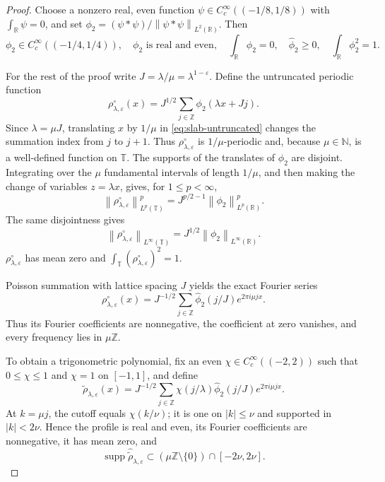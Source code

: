 \documentclass[12pt,reqno,letterpaper]{amsart}
\numberwithin{equation}{section}
\theoremstyle{definition}
\newcommand{\T}{\mathbb T}
\newcommand{\R}{\mathbb R}
\newcommand{\Z}{\mathbb Z}
\newcommand{\eps}{\varepsilon}
\newcommand{\la}{\lambda}
\newcommand{\supp}{\operatorname{supp}}
\newcommand{\norm}[1]{\left\lVert #1\right\rVert}
\newcommand{\abs}[1]{\left\lvert #1\right\rvert}
\begin{document}
\begin{proof}
Choose a nonzero real, even function $\psi\in C_c^\infty((-1/8,1/8))$
with $\int_\R\psi=0$, and set
$\phi_2=(\psi*\psi)/\norm{\psi*\psi}_{L^2(\R)}$.  Then
\begin{equation*}
 \phi_2\in C_c^\infty((-1/4,1/4)),\quad
 \phi_2\text{ is real and even},\quad
 \int_\R\phi_2=0,\quad \widehat\phi_2\geq0,
 \quad \int_\R\phi_2^2=1.
\end{equation*}

For the rest of the proof write $J=\la/\mu=\la^{1-\eps}$.  Define the
untruncated periodic function
\begin{equation}\label{eq:slab-untruncated}
 \rho^\circ_{\la,\eps}(x)
 =J^{1/2}\sum_{j\in\Z}\phi_2(\la x+Jj).
\end{equation}
Since $\la=\mu J$, translating $x$ by $1/\mu$ in
\eqref{eq:slab-untruncated} changes the summation index from $j$ to
$j+1$.  Thus
$\rho^\circ_{\la,\eps}$ is $1/\mu$-periodic and, because
$\mu\in\mathbb N$, is a
well-defined function on $\T$.  The supports of the translates of $\phi_2$ are
disjoint.  Integrating over the $\mu$ fundamental intervals of length
$1/\mu$, and then making the change of variables $z=\la x$, gives, for
$1\leq p<\infty$,
\begin{equation}\label{eq:slab-untruncated-Lp}
 \norm{\rho^\circ_{\la,\eps}}_{L^p(\T)}^p
 =J^{p/2-1}\norm{\phi_2}_{L^p(\R)}^p.
\end{equation}
The same disjointness gives
\begin{equation}\label{eq:slab-untruncated-Linfty}
 \norm{\rho^\circ_{\la,\eps}}_{L^\infty(\T)}
 =J^{1/2}\norm{\phi_2}_{L^\infty(\R)}.
\end{equation}
$\rho^\circ_{\la,\eps}$ has mean zero and
$\int_\T(\rho^\circ_{\la,\eps})^2=1$.

Poisson summation with lattice spacing $J$ yields the exact Fourier series
\begin{equation*}
 \rho^\circ_{\la,\eps}(x)
 =J^{-1/2}\sum_{j\in\Z}
  \widehat\phi_2(j/J)e^{2\pi i\mu jx}.
\end{equation*}
Thus its Fourier coefficients are nonnegative, the coefficient at zero
vanishes, and every frequency lies in $\mu\Z$.

To obtain a trigonometric polynomial, fix an even
$\chi\in C_c^\infty((-2,2))$ such that
$0\leq\chi\leq1$ and $\chi=1$ on $[-1,1]$, and define
\begin{equation*}
 \widetilde\rho_{\la,\eps}(x)
 =J^{-1/2}\sum_{j\in\Z}
  \chi(j/\la)\widehat\phi_2(j/J)e^{2\pi i\mu jx}.
\end{equation*}
At $k=\mu j$, the cutoff equals $\chi(k/\nu)$; it is one on
$\abs k\leq\nu$ and supported in
$\abs k<2\nu$.  Hence the profile is real and even, its Fourier coefficients are
nonnegative, it has mean zero, and
\begin{equation}\label{eq:slab-truncated-support}
 \supp\widehat{\widetilde\rho}_{\la,\eps}
 \subset(\mu\Z\setminus\{0\})\cap[-2\nu,2\nu].
\end{equation}


\end{proof}
\end{document}
